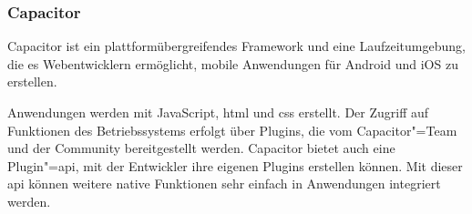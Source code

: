 \subsubsection{Capacitor}

Capacitor ist ein plattformübergreifendes Framework und eine Laufzeitumgebung, die es Webentwicklern ermöglicht, mobile Anwendungen für Android und iOS zu erstellen.
\cite{capacitor}

Anwendungen werden mit JavaScript, \ac{html} und \ac{css} erstellt.
Der Zugriff auf Funktionen des Betriebssystems erfolgt über Plugins, die vom Capacitor"=Team und der Community bereitgestellt werden.
Capacitor bietet auch eine Plugin"=\acs{api}, mit der Entwickler ihre eigenen Plugins erstellen können.
Mit dieser \ac{api} können weitere native Funktionen sehr einfach in Anwendungen integriert werden.
\cite{capacitor:docs}
